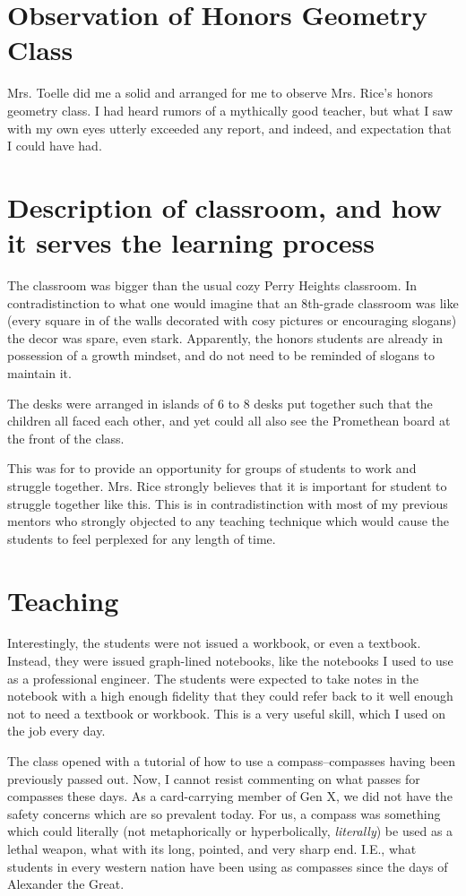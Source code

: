 \documentclass[11pt]{elegantbook}
\begin{document}
\section*{Observation of Honors Geometry Class}

Mrs. Toelle did me a solid and arranged for me to observe Mrs. Rice's
honors geometry class.  I had heard rumors of a mythically good
teacher, but what I saw with my own eyes utterly exceeded any report,
and indeed, and expectation that I could have had.

\section*{Description of classroom, and how it serves the learning process}

The classroom was bigger than the usual cozy Perry Heights classroom.
In contradistinction to what one would imagine that an 8th-grade
classroom was like (every square in of the walls decorated with cosy
pictures or encouraging slogans) the decor was spare, even stark.
Apparently, the honors students are already in possession of a growth
mindset, and do not need to be reminded of slogans to maintain it.

The desks were arranged in islands of 6 to 8 desks put together such
that the children all faced each other, and yet could all also see the
Promethean board at the front of the class.

This was for to provide an opportunity for groups of students to work
and struggle together.  Mrs. Rice strongly believes that it is
important for student to struggle together like this. This is in
contradistinction with most of my previous mentors who strongly
objected to any teaching technique which would cause the students to
feel perplexed for any length of time.

\section*{Teaching}

Interestingly, the students were not issued a workbook, or even a textbook.
Instead, they were issued graph-lined notebooks, like the notebooks
I used to use as a professional engineer.  The students were expected
to take notes in the notebook with a high enough fidelity that they
could refer back to it well enough not to need a textbook or workbook.
This is a very useful skill, which I used on the job every day.

The class opened with a tutorial of how to use a compass--compasses
having been previously passed out.  Now, I cannot resist commenting on
what passes for compasses these days.  As a card-carrying member of Gen X,
we did not have the safety concerns which are so prevalent today.
For us, a compass was something which could literally (not metaphorically or
hyperbolically, {\em literally}) be used as a lethal weapon, what with its
long, pointed, and very sharp end.  I.E., what students in every western
nation have been using as compasses since the days of Alexander the Great.
\end{document}
